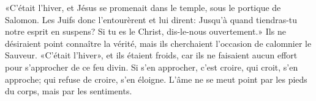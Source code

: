 «C’était l’hiver, et Jésus se promenait dans le temple,
	sous le portique de Salomon.
Les Juifs donc l’entourèrent et lui dirent:
	Jusqu’à quand tiendras-tu notre esprit en suspens?
	Si tu es le Christ, dis-le-nous ouvertement.»
Ils ne désiraient point connaître la vérité,
	mais ils cherchaient l’occasion de calomnier le Sauveur.
«C’était l’hiver», et ils étaient froids,
	car ils ne faisaient aucun effort pour s’approcher de ce feu divin.
Si s’en approcher, c’est croire,
	qui croit, s’en approche;
	qui refuse de croire, s’en éloigne.
L’âme ne se meut point par les pieds du corps,
	mais par les sentiments.
